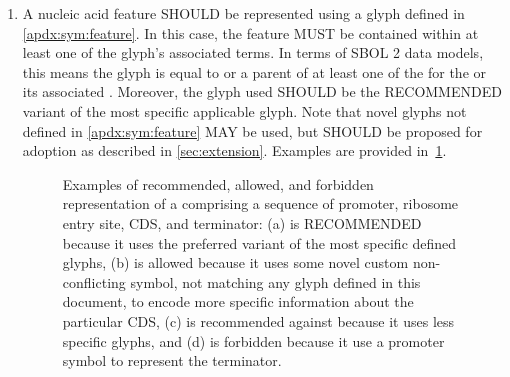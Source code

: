 \begin{enumerate}
\item A nucleic acid feature SHOULD be represented using a glyph defined in \ref{apdx:sym:feature}.  In this case, the feature MUST be contained within at least one of the glyph's associated terms.
In terms of SBOL 2 data models, this means the glyph is equal to or a parent of at least one of the  for the  or its associated .
	Moreover, the glyph used SHOULD be the RECOMMENDED variant of the most specific applicable glyph.  Note that novel glyphs not defined in \ref{apdx:sym:feature} MAY be used, but SHOULD be proposed for adoption as described in \ref{sec:extension}.
	Examples are provided in~\ref{exa:2f}.
	\begin{figure}[h!]
	\centering
	\caption{Examples of recommended, allowed, and forbidden representation of a  comprising a sequence of promoter, ribosome entry site, CDS, and terminator: (a) is RECOMMENDED because it uses the preferred variant of the most specific defined glyphs, (b) is allowed because it uses some novel custom non-conflicting symbol, not matching any glyph defined in this document, to encode more specific information about the particular CDS, (c) is recommended against because it uses less specific glyphs, and (d) is forbidden because it use a promoter symbol to represent the terminator.}
	\label{exa:2f}
	\end{figure}
\end{enumerate}


